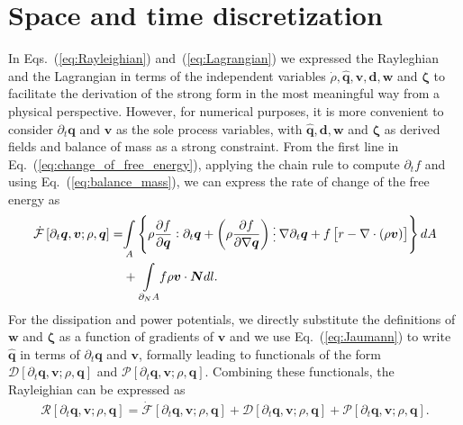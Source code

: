\section{Space and time discretization}

In Eqs.~(\ref{eq:Rayleighian}) and~(\ref{eq:Lagrangian}) we expressed the Rayleghian and the Lagrangian in terms of the independent variables $\dot{\rho},\widehat{\bm{q}},\bm{v},\bm{d},\bm{w}$ and $\bm{\zeta}$ to facilitate the derivation of the strong form in the most meaningful way from a physical perspective. However, for numerical purposes, it is more convenient to  consider $\partial_t{\bm{q}}$ and $\bm{v}$ as the sole process variables, with $\widehat{\bm{q}},\bm{d},\bm{w}$ and $\bm{\zeta}$ as derived fields and balance of mass as a strong constraint. From the first line in Eq.~(\ref{eq:change_of_free_energy}), applying the chain rule to compute $\partial_t f$ and using Eq.~(\ref{eq:balance_mass}), we can express the rate of change of the free energy as
\begin{align} \label{eq:discrete_free_energy}
	\dot{\mathcal{F}}\left[\partial_t\bm{q},\bm{v};\rho,\bm{q}\right] = &  \underset{A}{\int} \left\{ \rho \frac{\partial f}{\partial \bm{q}} : \partial_t \bm{q} + \left(\rho \frac{\partial f}{\partial \nabla \bm{q}}\right) \cdddot \, \nabla \partial_t \bm{q} + f \left[r-\nabla\cdot\left(\rho\bm{v}\right)\right] \right\}dA  \\ &  +  \underset{\partial_{N}A}{\int} f\rho \bm{v} \cdot\bm{N} dl. \nonumber
\end{align}
For the dissipation and power potentials, we directly substitute the definitions of $\bm{w}$ and $\bm{\zeta}$ as a function of gradients of $\bm{v}$ and we use Eq.~(\ref{eq:Jaumann}) to write $\widehat{\bm{q}}$ in terms of $\partial_t \bm{q}$ and $\bm{v}$, formally leading to functionals of the form $\mathcal{D}[\partial_t\bm{q},\bm{v};\rho,\bm{q}]$ and $\mathcal{P}[\partial_t\bm{q},\bm{v};\rho,\bm{q}]$.
Combining these functionals,  the Rayleighian can be expressed as
\begin{align}  \label{eq:ray_discrte}
	\mathcal{R}[\partial_t\bm{q},\bm{v};\rho,\bm{q}] = \dot{\mathcal{F}}[\partial_t\bm{q},\bm{v};\rho,\bm{q}]+ \mathcal{D}[\partial_t\bm{q},\bm{v};\rho,\bm{q}]+ \mathcal{P}[\partial_t\bm{q},\bm{v};\rho,\bm{q}].
\end{align}
